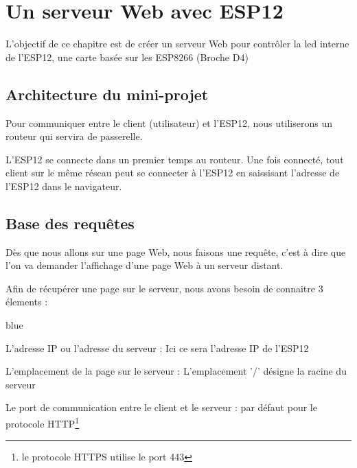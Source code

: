 \chapter{Un serveur Web avec ESP12}

L'objectif de ce chapitre est de créer un serveur Web pour contrôler la led interne de l'ESP12, une carte basée sur les ESP8266 (Broche D4)


\section{Architecture du mini-projet}

Pour communiquer entre le client (utilisateur) et l'ESP12, nous utiliserons un routeur qui servira de passerelle.


L'ESP12 se connecte dans un premier temps au routeur. 
Une fois connecté, tout client sur le même réseau peut se connecter à l'ESP12 en saissisant l'adresse de l'ESP12 dans le navigateur.

\section{Base des requêtes}

Dès que nous allons sur une page Web, nous faisons une requête, c'est à dire que l'on va demander l'affichage d'une page Web à un serveur distant.


Afin de récupérer une page sur le serveur, nous avons besoin de connaitre 3 élements :

\begin{items}{blue}{\Triangle}
    \item L'adresse IP ou l'adresse du serveur : Ici ce sera l'adresse IP de l'ESP12
    \item L'emplacement de la page sur le serveur : L'emplacement '/' désigne la racine du serveur
    \item Le port de communication entre le client et le serveur :  par défaut pour le protocole HTTP\footnote{le protocole HTTPS utilise le port 443}
\end{items}


